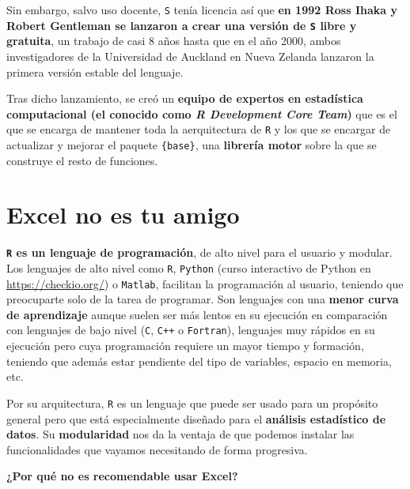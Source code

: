 \documentclass[11pt,]{book}
\begin{document}
Sin embargo, salvo uso docente, \texttt{S} tenía licencia así que \textbf{en 1992 Ross Ihaka y Robert Gentleman se lanzaron a crear una versión de \texttt{S} libre y gratuita}, un trabajo de casi 8 años hasta que en el año 2000, ambos investigadores de la Universidad de Auckland en Nueva Zelanda lanzaron la primera versión estable del lenguaje.

Tras dicho lanzamiento, se creó un \textbf{equipo de expertos en estadística computacional (el conocido como \emph{R Development Core Team})} que es el que se encarga de mantener toda la aerquitectura de \texttt{R} y los que se encargar de actualizar y mejorar el paquete \texttt{\{base\}}, una \textbf{librería motor} sobre la que se construye el resto de funciones.

\hypertarget{excel-no-es-tu-amigo}{%
\section{Excel no es tu amigo}\label{excel-no-es-tu-amigo}}

\textbf{\texttt{R} es un lenguaje de programación}, de alto nivel para el usuario y modular. Los lenguajes de alto nivel como \texttt{R}, \texttt{Python} (curso interactivo de Python en \url{https://checkio.org/}) o \texttt{Matlab}, facilitan la programación al usuario, teniendo que preocuparte solo de la tarea de programar. Son lenguajes con una \textbf{menor curva de aprendizaje} aunque suelen ser más lentos en su ejecución en comparación con lenguajes de bajo nivel (\texttt{C}, \texttt{C++} o \texttt{Fortran}), lenguajes muy rápidos en su ejecución pero cuya programación requiere un mayor tiempo y formación, teniendo que además estar pendiente del tipo de variables, espacio en memoria, etc.

Por su arquitectura, \texttt{R} es un lenguaje que puede ser usado para un propósito general pero que está especialmente diseñado para el \textbf{análisis estadístico de datos}. Su \textbf{modularidad} nos da la ventaja de que podemos instalar las funcionalidades que vayamos necesitando de forma progresiva.

\textbf{¿Por qué no es recomendable usar Excel?}
\end{document}
